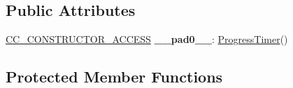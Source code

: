 \subsection*{Public Attributes}
\begin{DoxyCompactItemize}
\item 
\mbox{\label{classProgressTimer_a14503c0072cee80efd1df22c8e149971}} 
\hyperlink{_2cocos2d_2cocos_2base_2ccConfig_8h_a25ef1314f97c35a2ed3d029b0ead6da0}{C\+C\+\_\+\+C\+O\+N\+S\+T\+R\+U\+C\+T\+O\+R\+\_\+\+A\+C\+C\+E\+SS} {\bfseries \+\_\+\+\_\+pad0\+\_\+\+\_\+}\+: \hyperlink{classProgressTimer}{Progress\+Timer}()
\end{DoxyCompactItemize}
\subsection*{Protected Member Functions}
